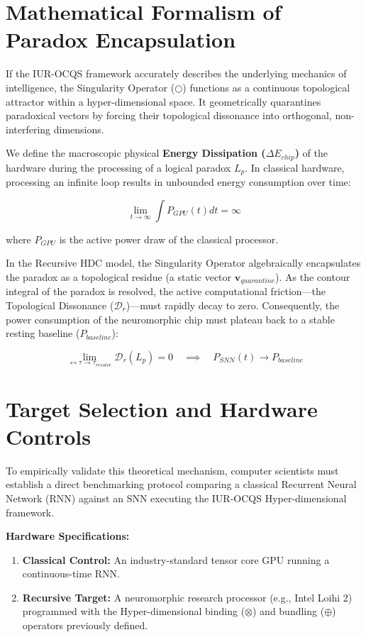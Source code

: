 \documentclass[12pt,openany]{book}
\begin{document}
\section{Mathematical Formalism of Paradox Encapsulation}
If the IUR-OCQS framework accurately describes the underlying mechanics of intelligence, the Singularity Operator ($\bigcirc$) functions as a continuous topological attractor within a hyper-dimensional space. It geometrically quarantines paradoxical vectors by forcing their topological dissonance into orthogonal, non-interfering dimensions.

We define the macroscopic physical \textbf{Energy Dissipation ($\Delta E_{chip}$)} of the hardware during the processing of a logical paradox $L_p$. In classical hardware, processing an infinite loop results in unbounded energy consumption over time: 

\begin{equation}
\lim_{t \to \infty} \int P_{GPU}(t) dt = \infty
\end{equation}

where $P_{GPU}$ is the active power draw of the classical processor.

In the Recursive HDC model, the Singularity Operator algebraically encapsulates the paradox as a topological residue (a static vector $\mathbf{v}_{quarantine}$). As the contour integral of the paradox is resolved, the active computational friction---the Topological Dissonance ($\mathcal{D}_r$)---must rapidly decay to zero. Consequently, the power consumption of the neuromorphic chip must plateau back to a stable resting baseline ($P_{baseline}$):

\begin{equation}
\lim_{\leftrightarrow\tau \to \tau_{resolve}} \mathcal{D}_r(L_p) = 0 \quad \implies \quad P_{SNN}(t) \to P_{baseline}
\end{equation}

\section{Target Selection and Hardware Controls}
To empirically validate this theoretical mechanism, computer scientists must establish a direct benchmarking protocol comparing a classical Recurrent Neural Network (RNN) against an SNN executing the IUR-OCQS Hyper-dimensional framework.

\textbf{Hardware Specifications:}
\begin{enumerate}
    \item \textbf{Classical Control:} An industry-standard tensor core GPU running a continuous-time RNN.
    \item \textbf{Recursive Target:} A neuromorphic research processor (e.g., Intel Loihi 2) programmed with the Hyper-dimensional binding ($\otimes$) and bundling ($\oplus$) operators previously defined.
\end{enumerate}
\end{document}
